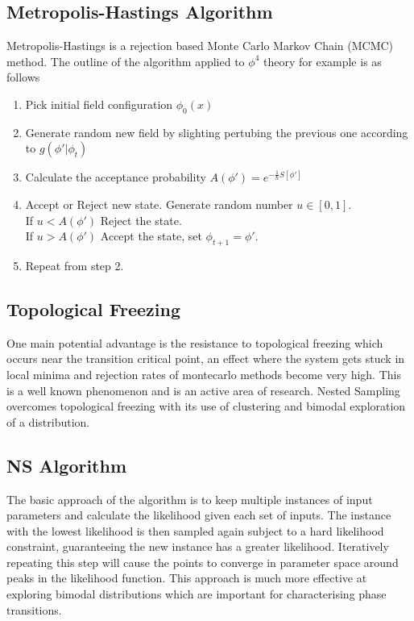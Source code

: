 \documentclass[a4paper]{article}
\begin{document}
    \subsection{Metropolis-Hastings Algorithm}
    Metropolis-Hastings is a rejection based Monte Carlo Markov Chain
    (MCMC) method. The outline of the algorithm applied to $\phi^4$
    theory for example is as follows
    \begin{enumerate}
      \item Pick initial field configuration $\phi_0(x)$
      \item Generate random new field by slighting pertubing the
        previous one according to $g(\phi' | \phi_t)$
      \item Calculate the acceptance probability $A(\phi') =
        e^{-\frac{1}{\hbar}S[\phi']}$
      \item Accept or Reject new state. Generate random number $u \in
        [0,1]$. \\
        If $u < A(\phi')$ Reject the state. \\
        If $u > A(\phi')$ Accept the state, set $\phi_{t+1} = \phi'$.
        \item Repeat from step 2.
      \end{enumerate}

      
    \subsection{Topological Freezing}
    One main potential advantage is the resistance to
    topological freezing which occurs near the transition critical point, an
    effect where the system gets stuck in local minima and rejection
    rates of montecarlo methods become very high. This is a well known
    phenomenon and is an active area of research.\cite{4} Nested
    Sampling overcomes topological freezing with its use of clustering
    and bimodal exploration of a distribution.

    \subsection{NS Algorithm}
    The basic approach of the algorithm is to keep multiple instances
    of input parameters and calculate the likelihood given each set of
    inputs. The instance with the lowest likelihood is then sampled
    again subject to a hard likelihood constraint, guaranteeing the
    new instance has a greater likelihood. Iteratively repeating this
    step will cause the points to converge in parameter space around
    peaks in the likelihood function. This approach is much more
    effective at exploring bimodal distributions which are important
    for characterising phase transitions.
    
\end{document}

